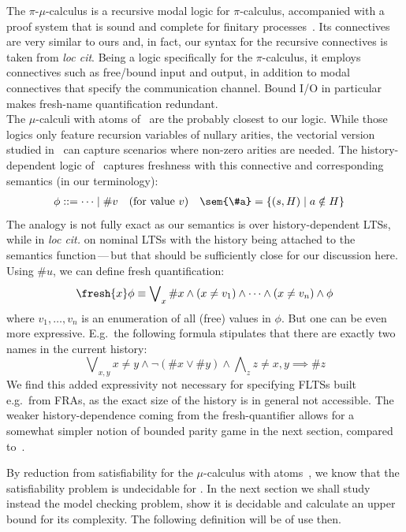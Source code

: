 \begin{remark}
  The $\pi$-$\mu$-calculus is a recursive modal logic for $\pi$-calculus, accompanied with a proof system that is sound and complete for finitary processes~\cite{Dam03}.
  Its connectives are very similar to ours and, in fact, our syntax for the recursive connectives is taken from \emph{loc cit}. Being a logic specifically for the $\pi$-calculus, it employs connectives such as free/bound input and output, in addition to modal connectives that specify the communication channel. Bound I/O in particular makes fresh-name quantification redundant. 
  \\
  The $\mu$-calculi with atoms of~\cite{KlinL19,KlinHD} are the probably closest to our logic. While those logics only feature recursion variables of nullary arities, the vectorial version studied in~\cite{KlinL19} can capture scenarios where non-zero arities are needed. The history-dependent logic of~\cite{KlinHD} captures freshness with this connective and corresponding semantics (in our terminology):
  \begin{align*}
\phi &::= \cdots \mid \#v\quad \text{(for value $v$)}
    &
\sem{\#a} &= \{(s,H)\mid a\notin H\}
  \end{align*}      
The analogy is not fully exact as our semantics is over history-dependent LTSs, while in \emph{loc cit.} on nominal LTSs with the history being attached to the semantics function\,---\,but that should be sufficiently close for our discussion here. Using $\#u$, we can define fresh quantification:
  \[
\fresh{x}\phi \equiv \bigvee\nolimits_x\#x\land(x\neq v_1)\land\cdots\land(x\neq v_n)\land\phi
\]
where $v_1,\dots,v_n$ is an enumeration of all (free) values in $\phi$.
But one can be even more expressive. E.g.\ the following formula stipulates that there are exactly two names in the current history:
\[
  \bigvee\nolimits_{x,y}x\neq y\land\lnot(\#x\lor\#y)\land
  \bigwedge\nolimits_{z}z\neq x,y\implies\#z
\]
We find this added expressivity not necessary for specifying FLTSs built e.g.\ from FRAs, as the exact size of the history is in general not accessible. The weaker history-dependence coming from the fresh-quantifier allows for a somewhat simpler notion of bounded parity game in the next section, compared to~\cite{KlinHD}. 
\end{remark}

By reduction from satisfiability for the $\mu$-calculus with atoms~\cite{KlinL19}, we know that the satisfiability problem is undecidable for \fhml. In the next section we shall study instead the model checking problem, show it is decidable and calculate an upper bound for its complexity.
The following definition will be of use then.

